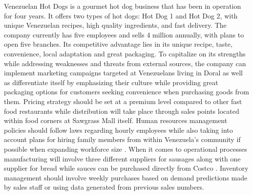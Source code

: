  

Venezuelan Hot Dogs is a gourmet hot dog business that has been in operation for four years. It offers two types of hot dogs: Hot Dog 1 and Hot Dog 2, with unique Venezuelan recipes, high quality ingredients, and fast delivery. The company currently has five employees and sells 4 million annually, with plans to open five branches. Its competitive advantage lies in its unique recipe, taste, convenience, local adaptation and great packaging. To capitalize on its strengths while addressing weaknesses and threats from external sources, the company can implement marketing campaigns targeted at Venezuelans living in Doral as well as differentiate itself by emphasizing their culture while providing great packaging options for customers seeking convenience when purchasing goods from them. Pricing strategy should be set at a premium level compared to other fast food restaurants while distribution will take place through sales points located within food corners at Sawgrass Mall itself. Human resources management policies should follow laws regarding hourly employees while also taking into account plans for hiring family members from within Venezuela’s community if possible when expanding workforce size . When it comes to operational processes manufacturing will involve three different suppliers for sausages along with one supplier for bread while sauces can be purchased directly from Costco . Inventory management should involve weekly purchases based on demand predictions made by sales staff or using data generated from previous sales numbers.
